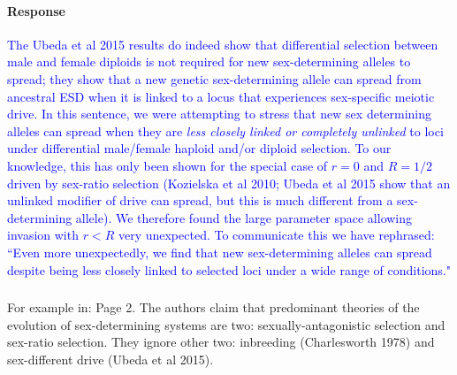 \documentclass[10pt,letterpaper]{article}
\begin{document}
\noindent\paragraph{Response}
\textcolor{blue}{The Ubeda et al 2015 results do indeed show that differential selection between male and female diploids is not required for new sex-determining alleles to spread; they show that a new genetic sex-determining allele can spread from ancestral ESD when it is linked to a locus that experiences sex-specific meiotic drive. 
In this sentence, we were attempting to stress that new sex determining alleles can spread when they are \textit{less closely linked or completely unlinked} to loci under differential male/female haploid and/or diploid selection. 
To our knowledge, this has only been shown for the special case of $r=0$ and $R=1/2$ driven by sex-ratio selection (Kozielska et al 2010; Ubeda et al 2015 show that an unlinked modifier of drive can spread, but this is much different from a sex-determining allele). We therefore found the large parameter space allowing invasion with $r<R$ very unexpected.}
\textcolor{blue}{To communicate this we have rephrased: ``Even more unexpectedly, we find that new sex-determining alleles can spread despite being less closely linked to selected loci under a wide range of conditions."}

\noindent\subsubsection{}
For example in: Page 2. The authors claim that predominant theories of the evolution of sex-determining systems are two: sexually-antagonistic selection and sex-ratio selection. They ignore other two: inbreeding (Charlesworth 1978) and sex-different drive (Ubeda et al 2015). 
\end{document}
